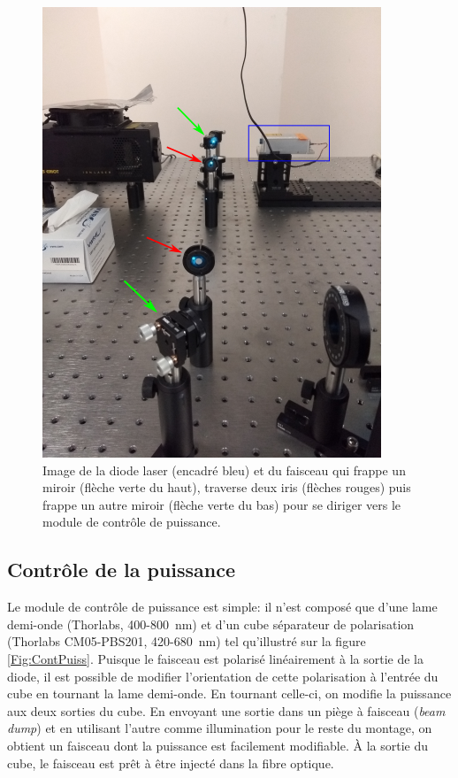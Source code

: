 \documentclass{article}       %
\begin{document}
\begin{figure}[h]
    \centering
    \includegraphics[scale=0.75]{fig/SortieMod.PNG}
    \caption{Image de la diode laser (encadré bleu) et du faisceau qui frappe un miroir (flèche verte du haut), traverse deux iris (flèches rouges) puis frappe un autre miroir (flèche verte du bas) pour se diriger vers le module de contrôle de puissance.}
    \label{Fig:SortieLaser}
\end{figure}

\subsection{Contrôle de la puissance}

Le module de contrôle de puissance est simple: il n'est composé que d'une lame demi-onde (Thorlabs, 400-800~nm) et d'un cube séparateur de polarisation (Thorlabs CM05-PBS201, 420-680~nm) tel qu'illustré sur la figure \ref{Fig:ContPuiss}. Puisque le faisceau est polarisé linéairement à la sortie de la diode, il est possible de modifier l'orientation de cette polarisation à l'entrée du cube en tournant la lame demi-onde. En tournant celle-ci, on modifie la puissance aux deux sorties du cube. En envoyant une sortie dans un piège à faisceau (\textit{beam dump}) et en utilisant l'autre comme illumination pour le reste du montage, on obtient un faisceau dont la puissance est facilement modifiable. À la sortie du cube, le faisceau est prêt à être injecté dans la fibre optique.
\end{document}
